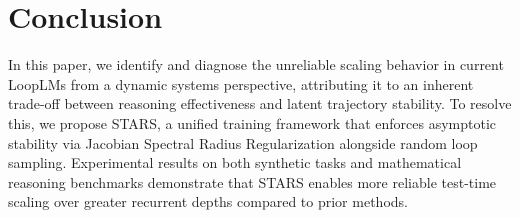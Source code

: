 
\section{Conclusion}
In this paper, we identify and diagnose the unreliable scaling behavior in current LoopLMs from a dynamic systems perspective, attributing it to an inherent trade-off between reasoning effectiveness and latent trajectory stability. To resolve this, we propose STARS, a unified training framework that enforces asymptotic stability via Jacobian Spectral Radius Regularization alongside random loop sampling. Experimental results on both synthetic tasks and mathematical reasoning benchmarks demonstrate that STARS enables more reliable test-time scaling over greater recurrent depths compared to prior methods.
